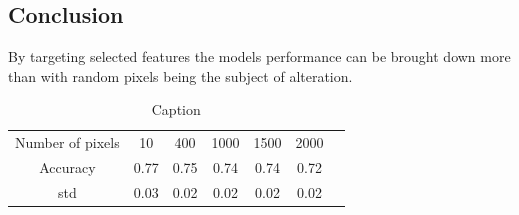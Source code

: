 \documentclass{article}
\begin{document}
\subsection{Conclusion}
By targeting selected features the models performance can be brought down more than with random pixels being the subject of alteration.
\begin{table}[H]
    \centering
    \begin{tabular}{c|c|c|c|c|c|c}
        Number of pixels & 10 &  400  & 1000 & 1500 &2000  \\
        Accuracy & 0.77 & 0.75 & 0.74 & 0.74 & 0.72\\
        std & 0.03 & 0.02& 0.02 & 0.02 & 0.02\\
        
    \end{tabular}
    \caption{Caption}
    \label{pixel accuracy}
\end{table}
\end{document}
